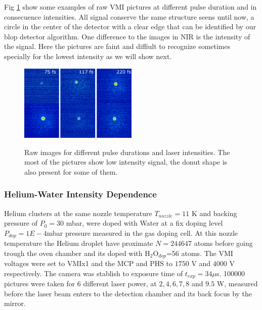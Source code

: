 Fig \ref{fig;MIrlaserraw} show some examples of raw VMI pictures at different pulse duration and in consecuence intensities. All signal conserve the same structure seens until now, a circle in the center of the detector with a clear edge that can be identified by our blop detector algorithm. One difference to the images in NIR is the intensity of the signal. Here the pictures are faint and  diffiult to recognize sometimes specially for the lowest intensity as we will show next.

\begin{figure}[hbtp]
\caption[MIR He laser parameter examples ]{Raw images for different pulse durations and laser intensities. The most of the pictures show low intensity signal, the donut shape is also present for some of them.}
\centering
\includegraphics[width=0.5\textwidth]{../Images/results/MIR_He_pulsescan/raw/RAW_MIR_He_pulsescan.png}
\label{fig;MIrlaserraw}
\end{figure}

\subsubsection{Helium-Water Intensity Dependence}

Helium clusters at the same nozzle temperature $T_{nozzle}=11$ K and backing pressure of $P_{0}=30$ mbar, were doped with Water at a fix doping level $P_{dop}=1E-4$mbar pressure measured in the gas doping cell. At this nozzle temperature the Helium droplet have proximate $N=244647$ atoms before going trough the oven chamber and its doped with H$_{2}$O$_{dop}$=56 atoms. The VMI voltages were set to VMIx1 and the MCP and PHS to $1750$ V and $4000$ V respectively. The camera was stablish to exposure time of $t_{exp}=34 \mu$s. 100000 pictures were taken for 6 different laser power, at $2, 4, 6, 7, 8$ and $9.5$ W, measured before the laser beam enters to the detection chamber and its back focus by the mirror. 


